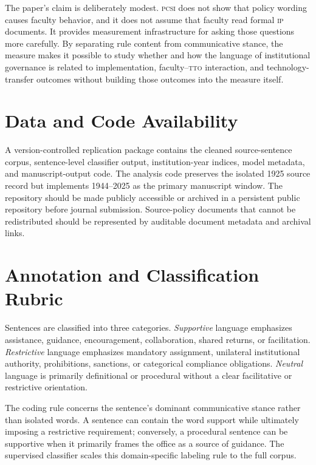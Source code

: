\documentclass[12pt]{article}
\newcommand{\PCSI}{\textsc{pcsi}}
\newcommand{\IP}{\textsc{ip}}
\newcommand{\TTO}{\textsc{tto}}
\begin{document}
The paper's claim is deliberately modest. \PCSI{} does not show that policy wording causes faculty behavior, and it does not assume that faculty read formal \IP{} documents. It provides measurement infrastructure for asking those questions more carefully. By separating rule content from communicative stance, the measure makes it possible to study whether and how the language of institutional governance is related to implementation, faculty--\TTO{} interaction, and technology-transfer outcomes without building those outcomes into the measure itself.

\section*{Data and Code Availability}

A version-controlled replication package contains the cleaned source-sentence corpus, sentence-level classifier output, institution-year indices, model metadata, and manuscript-output code. The analysis code preserves the isolated 1925 source record but implements 1944--2025 as the primary manuscript window. The repository should be made publicly accessible or archived in a persistent public repository before journal submission. Source-policy documents that cannot be redistributed should be represented by auditable document metadata and archival links.

\appendix

\section{Annotation and Classification Rubric}

Sentences are classified into three categories. \emph{Supportive} language emphasizes assistance, guidance, encouragement, collaboration, shared returns, or facilitation. \emph{Restrictive} language emphasizes mandatory assignment, unilateral institutional authority, prohibitions, sanctions, or categorical compliance obligations. \emph{Neutral} language is primarily definitional or procedural without a clear facilitative or restrictive orientation.

The coding rule concerns the sentence's dominant communicative stance rather than isolated words. A sentence can contain the word support while ultimately imposing a restrictive requirement; conversely, a procedural sentence can be supportive when it primarily frames the office as a source of guidance. The supervised classifier scales this domain-specific labeling rule to the full corpus.
\end{document}

